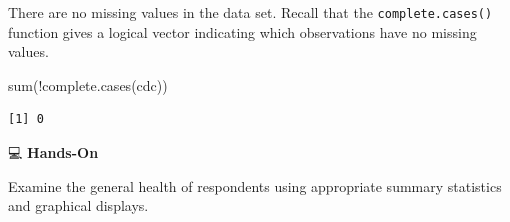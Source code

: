 \documentclass[
  letterpaper,
  DIV=11,
  numbers=noendperiod]{scrreprt}
\newenvironment{Shaded}{\begin{snugshade}}{\end{snugshade}}
\newcommand{\FunctionTok}[1]{\textcolor[rgb]{0.28,0.35,0.67}{#1}}
\newcommand{\NormalTok}[1]{\textcolor[rgb]{0.00,0.23,0.31}{#1}}
\newcommand{\SpecialCharTok}[1]{\textcolor[rgb]{0.37,0.37,0.37}{#1}}
\begin{document}
\begin{tcolorbox}[enhanced jigsaw, colbacktitle=quarto-callout-tip-color!10!white, opacitybacktitle=0.6, breakable, left=2mm, leftrule=.75mm, toprule=.15mm, toptitle=1mm, bottomtitle=1mm, colframe=quarto-callout-tip-color-frame, opacityback=0, coltitle=black, arc=.35mm, titlerule=0mm, colback=white, bottomrule=.15mm, title=\textcolor{quarto-callout-tip-color}{\faLightbulb}\hspace{0.5em}{Answer}, rightrule=.15mm]

There are no missing values in the data set. Recall that the
\texttt{complete.cases()} function gives a logical vector indicating
which observations have no missing values.

\begin{Shaded}
\begin{Highlighting}[]
\FunctionTok{sum}\NormalTok{(}\SpecialCharTok{!}\FunctionTok{complete.cases}\NormalTok{(cdc))}
\end{Highlighting}
\end{Shaded}

\begin{verbatim}
[1] 0
\end{verbatim}

\end{tcolorbox}

💻 \textbf{Hands-On}

Examine the general health of respondents using appropriate summary
statistics and graphical displays.
\end{document}

